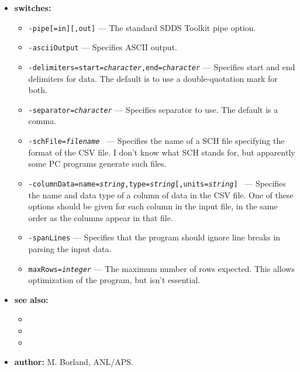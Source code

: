 \begin{itemize}
\item {\bf switches:}
    \begin{itemize}
    \item {\tt -pipe[=in][,out]} --- The standard SDDS Toolkit pipe option.
    \item {\tt -asciiOutput} --- Specifies ASCII output.
    \item {\tt -delimiters=start={\em character},end={\em character}} --- Specifies start and end
        delimiters for data.  The default is to use a double-quotation mark for both.
    \item {\tt -separator={\em character}} --- Specifies separator to use.  The default is a comma.
    \item {\tt -schFile={\em filename} } --- Specifies the name of a SCH file specifying the
        format of the CSV file.  I don't know what SCH stands for, but apparently some PC
        programs generate such files.
    \item {\tt -columnData=name={\em string},type={\em string}[,units={\em string}] } --- 
        Specifies the name and data
        type of a column of data in the CSV file.  One of these options should be given for each
        column in the input file, in the same order as the columns appear in that file. 
    \item {\tt -spanLines} --- Specifies that the program should ignore line breaks in parsing the 
        input data.
    \item {\tt maxRows={\em integer}} --- The maximum number of rows expected.  This allows
        optimization of the program, but isn't essential.
    \end{itemize}
\item {\bf see also:}
    \begin{itemize}
    \item {}
    \item {}
    \item {}
    \end{itemize}
\item {\bf author:} M. Borland, ANL/APS.
\end{itemize}

